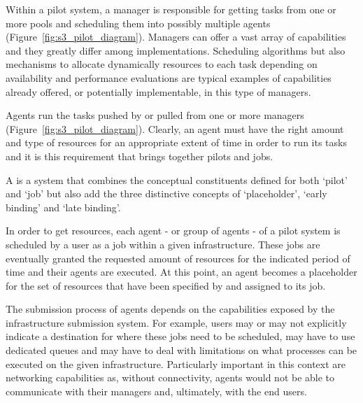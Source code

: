 \documentclass{sig-alternate}
\begin{document}

Within a pilot system, a manager is responsible for getting tasks from
one or more pools and scheduling them into possibly multiple agents
(Figure~\ref{fig:s3_pilot_diagram}). Managers can offer a vast array of
capabilities and they greatly differ among \pilotjob implementations.
Scheduling algorithms but also mechanisms to allocate dynamically
resources to each task depending on availability and performance
evaluations are typical examples of capabilities already offered, or
potentially implementable, in this type of managers.


Agents run the tasks pushed by or pulled from one or more managers
(Figure~\ref{fig:s3_pilot_diagram}). Clearly, an agent must have the right
amount and type of resources for an appropriate extent of time in order
to run its tasks and it is this requirement that brings together pilots
and jobs.


A \pilotjob is a system that combines the conceptual constituents
defined for both `pilot' and `job' but also add the three
distinctive concepts of `placeholder', `early binding' and `late
binding'.


In order to get resources, each agent - or group of agents - of a pilot
system is scheduled by a user as a job within a given infrastructure.
These jobs are eventually granted the requested amount of resources for
the indicated period of time and their agents are executed. At this
point, an agent becomes a placeholder for the set of resources that have
been specified by and assigned to its job. 


The submission process of agents depends on the capabilities exposed by
the infrastructure submission system. For example, users may or may not
explicitly indicate a destination for where these jobs need to be
scheduled, may have to use dedicated queues and may have to deal with
limitations on what processes can be executed on the given
infrastructure. Particularly important in this context are networking
capabilities as, without connectivity, agents would not be able to
communicate with their managers and, ultimately, with the end users.
\end{document}
